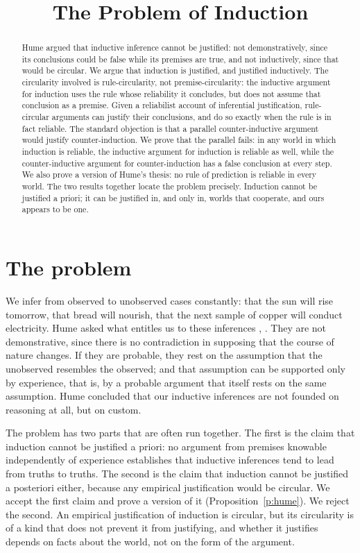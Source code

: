 \documentclass{situationist-preprint}
\title{The Problem of Induction}
\begin{document}
\maketitle

\begin{abstract}
Hume argued that inductive inference cannot be justified: not demonstratively, since its conclusions could be false while its premises are true, and not inductively, since that would be circular. We argue that induction is justified, and justified inductively. The circularity involved is rule-circularity, not premise-circularity: the inductive argument for induction uses the rule whose reliability it concludes, but does not assume that conclusion as a premise. Given a reliabilist account of inferential justification, rule-circular arguments can justify their conclusions, and do so exactly when the rule is in fact reliable. The standard objection is that a parallel counter-inductive argument would justify counter-induction. We prove that the parallel fails: in any world in which induction is reliable, the inductive argument for induction is reliable as well, while the counter-inductive argument for counter-induction has a false conclusion at every step. We also prove a version of Hume's thesis: no rule of prediction is reliable in every world. The two results together locate the problem precisely. Induction cannot be justified a priori; it can be justified in, and only in, worlds that cooperate, and ours appears to be one.
\end{abstract}

\section{The problem}

We infer from observed to unobserved cases constantly: that the sun will rise tomorrow, that bread will nourish, that the next sample of copper will conduct electricity. Hume asked what entitles us to these inferences \citep[1.3.6]{HumeTreatise}, \citep[IV]{HumeEnquiry}. They are not demonstrative, since there is no contradiction in supposing that the course of nature changes. If they are probable, they rest on the assumption that the unobserved resembles the observed; and that assumption can be supported only by experience, that is, by a probable argument that itself rests on the same assumption. Hume concluded that our inductive inferences are not founded on reasoning at all, but on custom.

The problem has two parts that are often run together. The first is the claim that induction cannot be justified a priori: no argument from premises knowable independently of experience establishes that inductive inferences tend to lead from truths to truths. The second is the claim that induction cannot be justified a posteriori either, because any empirical justification would be circular. We accept the first claim and prove a version of it (Proposition~\ref{p:hume}). We reject the second. An empirical justification of induction is circular, but its circularity is of a kind that does not prevent it from justifying, and whether it justifies depends on facts about the world, not on the form of the argument.
\end{document}
